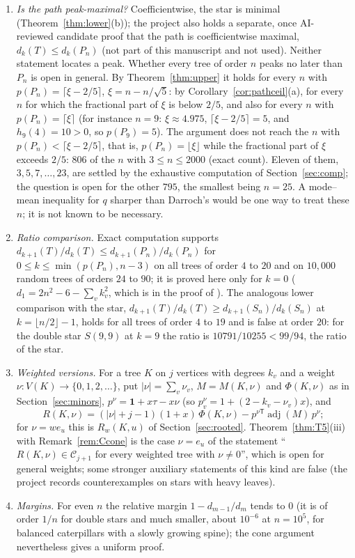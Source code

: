 \documentclass[11pt]{amsart}
\theoremstyle{definition}
\theoremstyle{remark}
\newcommand{\adj}{\operatorname{adj}}
\newcommand{\one}{\mathbf 1}
\newcommand{\T}{\mathsf T}
\begin{document}
\begin{enumerate}
\item \emph{Is the path peak-maximal?} Coefficientwise, the star is minimal
(Theorem~\ref{thm:lower}(b)); the project also holds a separate, once
AI-reviewed candidate proof that the path is coefficientwise maximal,
$d_k(T)\le d_k(P_n)$ (not part of this manuscript and not used). Neither
statement locates a peak. Whether every tree of order $n$ peaks no later than
$P_n$ is open in general. By Theorem~\ref{thm:upper} it holds for every $n$
with $p(P_n)=\lceil\xi-2/5\rceil$, $\xi=n-n/\sqrt5$: by
Corollary~\ref{cor:pathceil}(a), for every $n$ for which the fractional part
of $\xi$ is below $2/5$, and also for every $n$ with $p(P_n)=\lceil\xi\rceil$
(for instance $n=9$: $\xi\approx4.975$, $\lceil\xi-2/5\rceil=5$, and
$h_9(4)=10>0$, so $p(P_9)=5$). The argument does not reach the $n$ with
$p(P_n)<\lceil\xi-2/5\rceil$, that is, $p(P_n)=\lfloor\xi\rfloor$ while the
fractional part of $\xi$ exceeds $2/5$: $806$ of the $n$ with
$3\le n\le2000$ (exact count). Eleven of them, $3,5,7,\dots,23$, are settled by
the exhaustive computation of Section~\ref{sec:comp}; the question is open
for the other $795$, the smallest being $n=25$. A
mode--mean inequality for $q$ sharper than Darroch's would be one way to
treat these $n$; it is not known to be necessary.
\item \emph{Ratio comparison.} Exact computation supports
$d_{k+1}(T)/d_k(T)\le d_{k+1}(P_n)/d_k(P_n)$ for
$0\le k\le\min(p(P_n),n-3)$ on all trees of order $4$ to $20$ and on $10{,}000$
random trees of orders $24$ to $90$; it is proved here only for $k=0$
($d_1=2n^2-6-\sum_vk_v^2$, which is in the proof of \cite[Theorem~3.3]{AAB}).
The analogous lower comparison with the star,
$d_{k+1}(T)/d_k(T)\ge d_{k+1}(S_n)/d_k(S_n)$ at $k=\lfloor n/2\rfloor-1$, holds
for all trees of order $4$ to $19$ and is false at order $20$: for the double
star $S(9,9)$ at $k=9$ the ratio is $10791/10255<99/94$, the ratio of the star.
\item \emph{Weighted versions.} For a tree $K$ on $j$ vertices with degrees
$k_v$ and a weight $\nu\colon V(K)\to\{0,1,2,\dots\}$, put $|\nu|=\sum_v\nu_v$,
$M=M(K,\nu)$ and $\Phi(K,\nu)$ as in Section~\ref{sec:minors},
$p^\nu=\one+x\tau-x\nu$ (so $p^\nu_v=1+(2-k_v-\nu_v)x$), and
\[
R(K,\nu)=(|\nu|+j-1)(1+x)\,\Phi(K,\nu)-p^{\nu\T}\adj(M)\,p^\nu ;
\]
for $\nu=we_u$ this is $R_w(K,u)$ of Section~\ref{sec:rooted}.
Theorem~\ref{thm:T5}(iii) with Remark~\ref{rem:Ccone} is the case
$\nu=e_u$ of the statement ``$R(K,\nu)\in\mathcal C_{j+1}$ for every
weighted tree with $\nu\ne0$'', which is open for general weights; some
stronger auxiliary statements of this kind are false (the project records
counterexamples on stars with heavy leaves).
\item \emph{Margins.} For even $n$ the relative margin $1-d_{m-1}/d_m$ tends
to $0$ (it is of order $1/n$ for double stars and much smaller, about
$10^{-6}$ at $n=10^5$, for balanced caterpillars with a slowly growing spine);
the cone argument nevertheless gives a uniform proof.
\end{enumerate}
\end{document}
